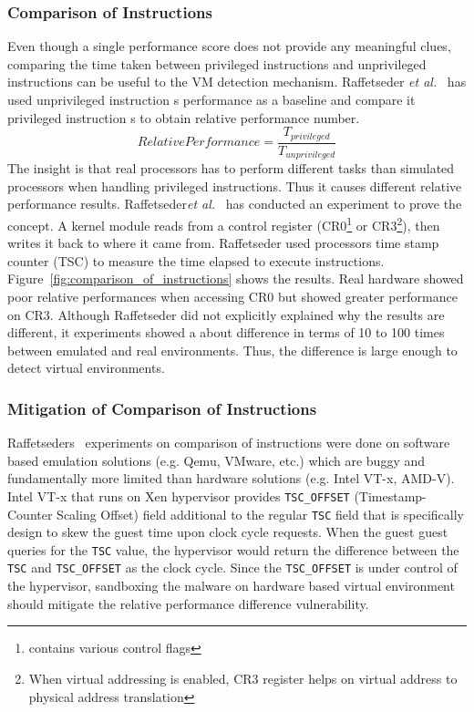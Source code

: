 \subsubsection{Comparison of Instructions}
Even though a single performance score does not provide any meaningful clues, comparing the time taken between privileged instructions and unprivileged instructions can be useful to the VM detection mechanism. Raffetseder {\em et al.}~\cite{raffetseder2007} has used unprivileged instruction \textquotesingle s performance as a baseline and compare it privileged instruction \textquotesingle s to obtain relative performance number.
\begin{equation*}
Relative Performance = \frac{T_{privileged}}{T_{unprivileged}}
\end{equation*}
The insight is that real processors has to perform different tasks than simulated processors when handling privileged instructions. Thus it causes different relative performance results.  Raffetseder{\em et al.}~\cite{raffetseder2007} has conducted an experiment to prove the concept. A kernel module reads from a control register (CR0\footnote{contains various control flags} or CR3\footnote{When virtual addressing is enabled, CR3 register helps on virtual address to physical address translation}), then writes it back to where it came from. Raffetseder used processor\textquotesingle s time stamp counter (TSC) to measure the time elapsed to execute instructions. Figure~\ref{fig:comparison_of_instructions} shows the results. Real hardware showed poor relative performances when accessing CR0 but showed greater performance on CR3. Although Raffetseder did not explicitly explained why the results are different, it experiments showed a about difference in terms of 10 to 100 times between emulated and real environments. Thus, the difference is large enough to detect virtual environments.

\subsubsection{Mitigation of Comparison of Instructions} \label{sssec:mitigation_relative}
Raffetseder\textquotesingle s~\cite{raffetseder2007} experiments on comparison of instructions were done on software based emulation solutions (e.g. Qemu, VMware, etc.) which are buggy and fundamentally more limited than hardware solutions (e.g. Intel VT-x, AMD-V). Intel VT-x that runs on Xen hypervisor provides \texttt{TSC\_OFFSET} (Timestamp-Counter Scaling Offset) field additional to the regular  \texttt{TSC} field that is specifically design to skew the guest time upon clock cycle requests. When the guest guest queries for the \texttt{TSC} value, the hypervisor would return the difference between the \texttt{TSC} and \texttt{TSC\_OFFSET} as the clock cycle. Since the \texttt{TSC\_OFFSET} is under control of the hypervisor, sandboxing the malware on hardware based virtual environment should mitigate the relative performance difference vulnerability.

